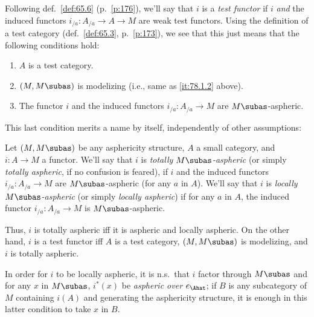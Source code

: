 Following def.\ \ref{def:65.6} (p.\ \ref{p:176}), we'll say that $i$
is a \emph{test functor} if $i$ \emph{and} the induced functors
$i_{/a}:A_{/a}\to A\to M$ are weak test functors. Using the definition
of a test category (def.\ \ref{def:65.3}, p.\ \ref{p:173}), we see
that this just means that the following conditions hold:
\begin{enumerate}[label=\arabic*')]
\item\label{it:78.1.1prime} $A$ is a test category.
\item\label{it:78.1.2prime} $(M,M\subas)$ is modelizing (i.e., same as
  \ref{it:78.1.2} above).
\item\label{it:78.1.3prime} The functor $i$ and the induced functors
  $i_{/a}:A_{/a}\to M$ are $M\subas$-aspheric.
\end{enumerate}

This last condition merits a name by itself, independently of other
assumptions:

\begin{definitionnum}\label{def:78.2}
  Let $(M,M\subas)$ be any asphericity structure, $A$ a small
  category, and $i:A\to M$ a functor. We'll say that $i$ is
  \emph{totally $M\subas$-aspheric} (or simply \emph{totally
    aspheric}, if no confusion is feared), if $i$ and the induced
  functors $i_{/a}:A_{/a}\to M$ are $M\subas$-aspheric (for any $a$ in
  $A$). We'll say that $i$ is \emph{locally $M\subas$-aspheric} (or
  simply \emph{locally aspheric}) if for any $a$ in $A$, the induced
  functor $i_{/a}:A_{/a}\to M$ is $M\subas$-aspheric.
\end{definitionnum}

Thus, $i$ is totally aspheric if{f} it is aspheric and locally
aspheric. On the other hand, $i$ is a test functor if{f} $A$ is a test
category, $(M,M\subas)$ is modelizing, and $i$ is totally aspheric.

In order for $i$ to be locally aspheric, it is n.s.\ that $i$ factor
through $M\subas$ and for any $x$ in $M\subas$, $i^*(x)$ be
\emph{aspheric over $e_\Ahat$}; if $B$ is any subcategory of $M$
containing $i(A)$ and generating the asphericity structure, it is
enough in this latter condition to take $x$ in $B$.

